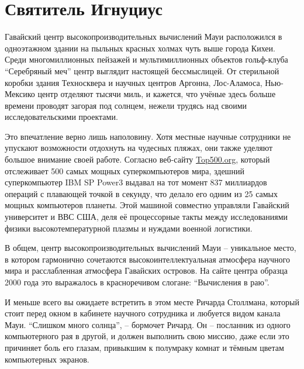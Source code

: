 
\chapter{Святитель Игнуциус}

Гавайский центр высокопроизводительных вычислений Мауи расположился в одноэтажном здании на пыльных красных холмах чуть выше города Кихеи. Среди многомиллионных пейзажей и мультимиллионных объектов гольф-клуба \enquote{Серебряный меч} центр выглядит настоящей бессмыслицей. От стерильной коробки здания Техносквера и научных центров Аргонна, Лос-Аламоса, Нью-Мексико центр отделяют тысячи миль, и кажется, что учёные здесь больше времени проводят загорая под солнцем, нежели трудясь над своими исследовательскими проектами.

Это впечатление верно лишь наполовину. Хотя местные научные сотрудники не упускают возможности отдохнуть на чудесных пляжах, они также уделяют большое внимание своей работе. Согласно веб-сайту \url{Top500.org}, который отслеживает 500 самых мощных суперкомпьютеров мира, здешний суперкомпьютер IBM SP Power3 выдавал на тот момент 837 миллиардов операций с плавающей точкой в секунду, что делало его одним из 25 самых мощных компьютеров планеты. Этой машиной совместно управляли Гавайский университет и ВВС США, деля её процессорные такты между исследованиями физики высокотемпературной плазмы и нуждами военной логистики.

В общем, центр высокопроизводительных вычислений Мауи -- уникальное место, в котором гармонично сочетаются высокоинтеллектуальная атмосфера научного мира и расслабленная атмосфера Гавайских островов. На сайте центра образца 2000 года это выражалось в красноречивом слогане: \enquote{Вычисления в раю}.

И меньше всего вы ожидаете встретить в этом месте Ричарда Столлмана, который стоит перед окном в кабинете научного сотрудника и любуется видом канала Мауи. \enquote{Слишком много солнца}, -- бормочет Ричард. Он -- посланник из одного компьютерного рая в другой, и должен выполнить свою миссию, даже если это причиняет боль его глазам, привыкшим к полумраку комнат и тёмным цветам компьютерных экранов.


